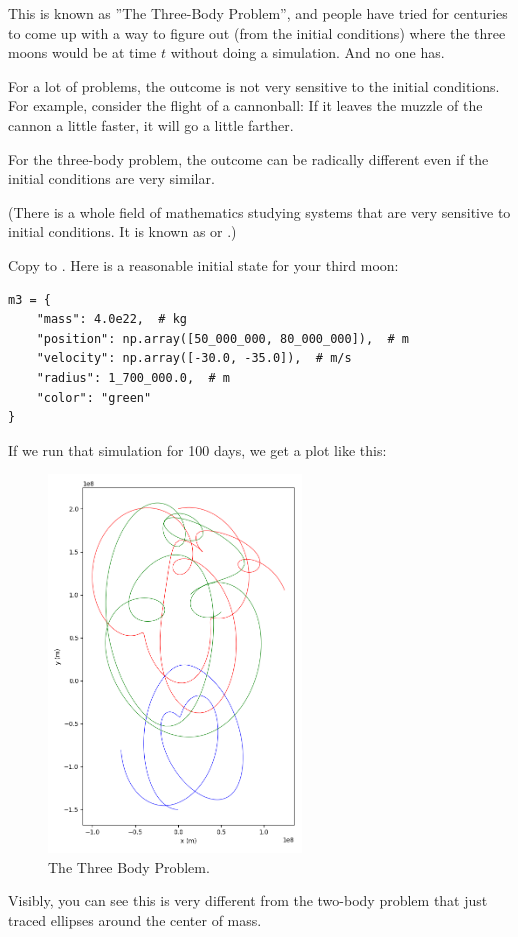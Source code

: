 This is known as ''The Three-Body Problem'', and people have tried for centuries to come up with 
a way to figure out (from the initial conditions) where the three moons would be at time $t$ without doing a simulation.  And no one has.

For a lot of problems,  the outcome is not very sensitive to the initial conditions. For example, consider the flight of a
cannonball:  If it leaves the muzzle of the cannon a little faster,  it will go a little farther.

For the three-body problem,  the outcome can be radically different even if the initial conditions are very similar.  

(There is a whole field of mathematics studying systems that are very sensitive to initial conditions.  It is known
as  or .)

Copy   to .  Here is a reasonable initial state for your third moon:

\begin{verbatim}
m3 = {
    "mass": 4.0e22,  # kg
    "position": np.array([50_000_000, 80_000_000]),  # m
    "velocity": np.array([-30.0, -35.0]),  # m/s
    "radius": 1_700_000.0,  # m
    "color": "green" 
}  
\end{verbatim}

If we run that simulation for 100 days, we get a plot like this:
\begin{figure}[htbp]
    \centering
    \includegraphics[width=0.6\textwidth]{plot3moons_01.png}
    \caption{The Three Body Problem.}
    \label{fig:threebodyproblem}
\end{figure}

Visibly, you can see this is very different from the two-body problem that just traced ellipses around the center of mass.
